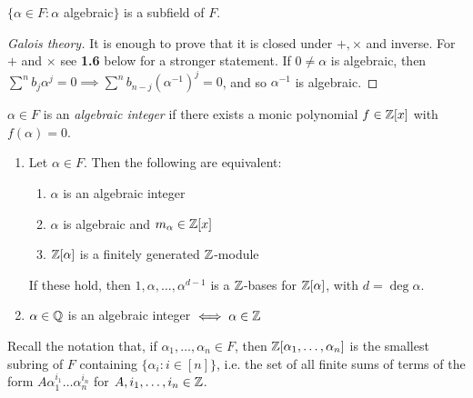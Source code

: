\documentclass[10pt,a4paper]{article}
\begin{document}
\begin{proposition}
$\{\alpha \in F : \alpha$ algebraic$\}$ is a subfield of $F$.
\end{proposition}
\begin{proof}[Galois theory]
It is enough to prove that it is closed under $+, \times$ and inverse. For $+$ and $\times$ see \textbf{1.6} below for a stronger statement. If $0 \neq \alpha$ is algebraic, then $\sum^n b_j \alpha^j = 0 \implies \sum^n b_{n-j}(\alpha^{-1})^j = 0$, and so $\alpha^{-1}$ is algebraic.
\end{proof}

$\alpha \in F$ is an \emph{algebraic integer} if there exists a monic polynomial $f \in \mathbb{Z}[x]$ with $f(\alpha) = 0$.

\begin{lemma}
\item
\begin{enumerate}
\item Let $\alpha \in F$. Then the following are equivalent:
\begin{enumerate}
\item $\alpha$ is an algebraic integer
\item $\alpha$ is algebraic and $m_\alpha \in \mathbb{Z}[x]$
\item $\mathbb{Z}[\alpha]$ is a finitely generated $\mathbb{Z}$-module
\end{enumerate}
If these hold, then $1, \alpha, \ldots, \alpha^{d-1}$ is a $\mathbb{Z}$-bases for $\mathbb{Z}[\alpha]$, with $d = \deg \alpha$.
\item $\alpha \in \mathbb{Q}$ is an algebraic integer $\iff \alpha \in \mathbb{Z}$
\end{enumerate}
\end{lemma}
Recall the notation that, if $\alpha_1, \ldots, \alpha_n \in F$, then $\mathbb{Z}[\alpha_1, \ldots, \alpha_n]$ is the smallest subring of $F$ containing $\{\alpha_i:i\in[n]\}$, i.e. the set of all finite sums of terms of the form $A\alpha_1^{i_1}\ldots\alpha_n^{i_n}$ for $A, i_1, \ldots, i_n \in \mathbb{Z}$.
\end{document}
